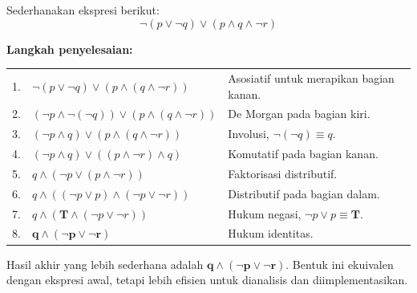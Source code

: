 \begin{contoh}
Sederhanakan ekspresi berikut:
\[
\neg(p \vee \neg q) \vee (p \wedge q \wedge \neg r)
\]

\textbf{Langkah penyelesaian:}
\vspace{2mm}
    
\begin{tabular}{p{0.4cm} p{6.2cm} p{6.5cm}}
    1. & $\neg(p \vee \neg q) \vee (p \wedge (q \wedge \neg r))$ & Asosiatif untuk merapikan bagian kanan. \\ 
    2. & $(\neg p \wedge \neg(\neg q)) \vee (p \wedge (q \wedge \neg r))$ & De Morgan pada bagian kiri. \\ 
    3. & $(\neg p \wedge q) \vee (p \wedge (q \wedge \neg r))$ & Involusi, $\neg(\neg q)\equiv q$. \\ 
    4. & $(\neg p \wedge q) \vee ((p \wedge \neg r) \wedge q)$ & Komutatif pada bagian kanan. \\ 
    5. & $q \wedge ( \neg p \vee (p \wedge \neg r) )$ & Faktorisasi distributif. \\
    6. & $q \wedge ( (\neg p \vee p) \wedge (\neg p \vee \neg r) )$ & Distributif pada bagian dalam. \\
    7. & $q \wedge ( \mathbf{T} \wedge (\neg p \vee \neg r) )$ & Hukum negasi, $\neg p \vee p \equiv \mathbf{T}$. \\
    8. & $\mathbf{q \wedge (\neg p \vee \neg r)}$ & Hukum identitas.
\end{tabular} 
\vspace{2mm}

Hasil akhir yang lebih sederhana adalah $\mathbf{q \wedge (\neg p \vee \neg r)}$. Bentuk ini ekuivalen dengan ekspresi awal, tetapi lebih efisien untuk dianalisis dan diimplementasikan.
\end{contoh}
